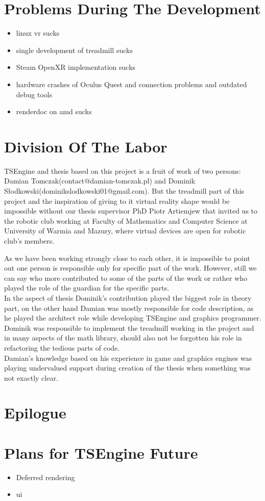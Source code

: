 \newpage
\section{Problems During The Development}
\label{sec:problems}
\hspace{\parindent}
\begin{itemize}
    \item linux vr sucks
    \item single development of treadmill sucks
    \item Steam OpenXR implementation sucks
    \item hardware crashes of Oculus Quest and connection problems and outdated debug tools
    \item renderdoc on amd sucks
\end{itemize}
\newpage
\section{Division Of The Labor}
\label{sec:labor}
\hspace{\parindent}
TSEngine and thesis based on this project is a fruit of work of two persons: Damian Tomczak(contact@damian-tomczak.pl) and Dominik Słodkowski(dominikslodkowski01@gmail.com).
But the treadmill part of this project and the inspiration of giving to it virtual reality shape would be impossible without our thesis supervisor PhD Piotr Artiemjew that invited us to the robotic club working at Faculty of Mathematics and Computer Science at University of Warmia and Mazury, where virtual devices are open for robotic club's members.

As we have been working strongly close to each other, it is impossible to point out one person is responsible only for specific part of the work. However, still we can say who more contributed to some of the parts of the work or rather who played the role of the guardian for the specific parts.\\
In the aspect of thesis Dominik's contribution played the biggest role in theory part, on the other hand Damian was mostly responsible for code description, as he played the architect role while developing TSEngine and graphics programmer. Dominik was responsible to implement the treadmill working in the project and in many aspects of the math library, should also not be forgotten his role in refactoring the tedious parts of code.\\ Damian's knowledge based on his experience in game and graphics engines was playing  undervalued support during creation of the thesis when something was not exactly clear.  
\section{Epilogue}
\section{Plans for TSEngine Future}
\begin{itemize}
    \item Deferred rendering
    \item ui
\end{itemize}